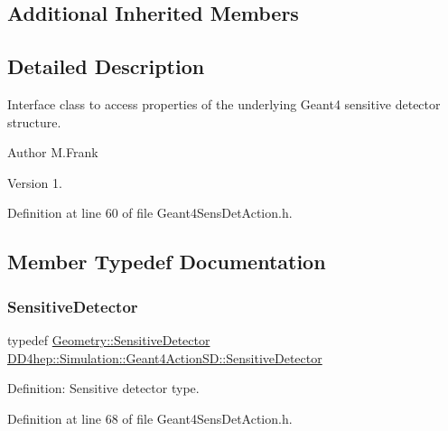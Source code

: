 \subsection*{Additional Inherited Members}


\subsection{Detailed Description}
Interface class to access properties of the underlying Geant4 sensitive detector structure. 

\begin{DoxyAuthor}{Author}
M.\+Frank 
\end{DoxyAuthor}
\begin{DoxyVersion}{Version}
1. 
\end{DoxyVersion}


Definition at line 60 of file Geant4\+Sens\+Det\+Action.\+h.



\subsection{Member Typedef Documentation}
\hypertarget{class_d_d4hep_1_1_simulation_1_1_geant4_action_s_d_a8a292947ea3f9b419728ef729a7e3fae}{}\label{class_d_d4hep_1_1_simulation_1_1_geant4_action_s_d_a8a292947ea3f9b419728ef729a7e3fae} 
\subsubsection{\texorpdfstring{Sensitive\+Detector}{SensitiveDetector}}
{\footnotesize\ttfamily typedef \hyperlink{class_d_d4hep_1_1_geometry_1_1_sensitive_detector}{Geometry\+::\+Sensitive\+Detector} \hyperlink{class_d_d4hep_1_1_simulation_1_1_geant4_action_s_d_a8a292947ea3f9b419728ef729a7e3fae}{D\+D4hep\+::\+Simulation\+::\+Geant4\+Action\+S\+D\+::\+Sensitive\+Detector}}



Definition\+: Sensitive detector type. 



Definition at line 68 of file Geant4\+Sens\+Det\+Action.\+h.



